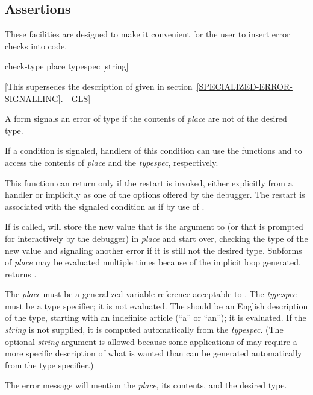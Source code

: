 \subsection{Assertions}
\label{CONDITION-ASSERTIONS}


These facilities are designed to make it convenient for the user
to insert error checks into code.

\begin{defmac}
check-type place typespec [string]

   [This supersedes the description of 
   given in section~\ref{SPECIALIZED-ERROR-SIGNALLING}.---GLS]

  A  form signals an error of type
   if the contents of \emph{place} are not of the
  desired type.

  If a condition is signaled, handlers of this condition can use the
  functions  and  to access the
  contents of \emph{place} and the \emph{typespec}, respectively.

  This function can return only if the  restart is invoked, either
  explicitly from a handler or implicitly as one of the options offered by the
  debugger.
The restart is associated with the signaled condition as if by
use of .

  If  is called,  will store the new value that is
  the argument to  (or that is prompted for interactively by
  the debugger) in \emph{place} and start over, checking the type of the new value
  and signaling another error if it is still not the desired type. Subforms
  of \emph{place} may be evaluated multiple times because of the implicit loop
  generated.  returns .

  The \emph{place} must be a generalized variable reference acceptable to . The
  \emph{typespec} must be a type specifier; it is not evaluated.  The  should
  be an English description of the type, starting with an indefinite article
  (``a'' or ``an''); it is evaluated. If the \emph{string} is not supplied, it is computed
  automatically from the \emph{typespec}. (The optional \emph{string} argument is allowed 
  because some applications of  may require a more specific
  description of what is wanted than can be generated automatically from the
  type specifier.)

  The error message will mention the \emph{place}, its contents, and the desired type.


\end{defmac}
